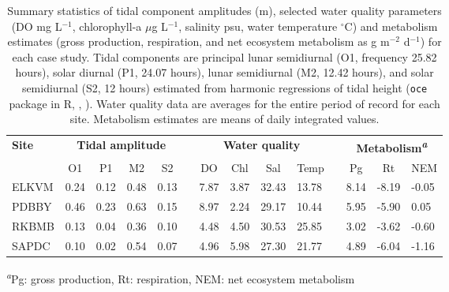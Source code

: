 \documentclass[letterpaper,12pt,oneside]{article}\usepackage[]{graphicx}\usepackage[]{color}
\begin{document}
%
\begin{table}[!tbp]
\caption{Summary statistics of tidal component amplitudes (m), selected water quality parameters (\ac{DO} mg L$^{-1}$, chlorophyll-a $\mu$g L$^{-1}$, salinity psu, water temperature $^{\circ}$C)  and metabolism estimates (gross production, respiration, and net ecosystem metabolism as g m$^{-2}$ d$^{-1}$) for each case study.  Tidal components are principal lunar semidiurnal (O1, frequency 25.82 hours), solar diurnal (P1, 24.07 hours), lunar semidiurnal (M2, 12.42 hours), and solar semidiurnal (S2, 12 hours) estimated from harmonic regressions of tidal height (\texttt{oce} package in R, \citealt{Foreman89}, ).  Water quality data are averages for the entire period of record for each site.  Metabolism estimates are means of daily integrated values.\label{tab:case_att}} 
\begin{center}
\begin{tabular}{lllllcllllclll}
\hline\hline
\multicolumn{1}{l}{\bfseries Site}&\multicolumn{4}{c}{\bfseries Tidal amplitude}&\multicolumn{1}{c}{\bfseries }&\multicolumn{4}{c}{\bfseries Water quality}&\multicolumn{1}{c}{\bfseries }&\multicolumn{3}{c}{\bfseries Metabolism\textsuperscript{\textit{a}}}\tabularnewline
\cline{2-5} \cline{7-10} \cline{12-14}
\multicolumn{1}{l}{}&\multicolumn{1}{c}{O1}&\multicolumn{1}{c}{P1}&\multicolumn{1}{c}{M2}&\multicolumn{1}{c}{S2}&\multicolumn{1}{c}{}&\multicolumn{1}{c}{DO}&\multicolumn{1}{c}{Chl}&\multicolumn{1}{c}{Sal}&\multicolumn{1}{c}{Temp}&\multicolumn{1}{c}{}&\multicolumn{1}{c}{Pg}&\multicolumn{1}{c}{Rt}&\multicolumn{1}{c}{NEM}\tabularnewline
\hline
ELKVM&0.24&0.12&0.48&0.13&&7.87&3.87&32.43&13.78&&8.14&-8.19&-0.05\tabularnewline
PDBBY&0.46&0.23&0.63&0.15&&8.97&2.24&29.17&10.44&&5.95&-5.90& 0.05\tabularnewline
RKBMB&0.13&0.04&0.36&0.10&&4.48&4.50&30.53&25.85&&3.02&-3.62&-0.60\tabularnewline
SAPDC&0.10&0.02&0.54&0.07&&4.96&5.98&27.30&21.77&&4.89&-6.04&-1.16\tabularnewline
\hline
\end{tabular}
\end{center}
\footnotesize\textsuperscript{\textit{a}}Pg: gross production, Rt: respiration, NEM: net ecosystem metabolism\end{table}
\end{document}
